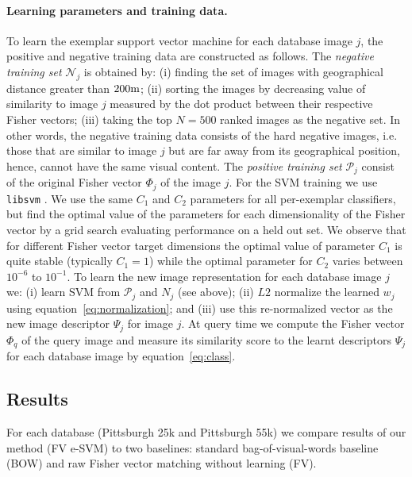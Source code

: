 \documentclass[10pt,twocolumn,letterpaper]{article}
\begin{document}
      \paragraph{Learning parameters and training data.}
         To learn the exemplar support vector machine for each database image $j$, the positive and negative training data are constructed as follows. The \emph{negative training set} $\mathcal N_j$ is obtained by: (i) finding the set of images with geographical distance greater than $200{\rm m}$; (ii)  sorting the images by decreasing value of similarity to image $j$ measured by the dot product between their respective Fisher vectors; (iii) taking the top $N=500$ ranked images as the negative set. In other words, the negative training data consists of the hard negative images, i.e. those that are similar to image $j$ but are far away from its geographical position, hence, cannot have the same visual content. The \emph{positive training set} $\mathcal P_j$
         consist of the original Fisher vector $\Phi_j$ of the image $j$.
         For the SVM training we use {\tt libsvm} \cite{libsvm}.
         We use the same $C_1$ and $C_2$ parameters for all per-exemplar classifiers, but find the optimal value of the parameters for each dimensionality of the Fisher vector by a grid search evaluating performance on a held out set.
         We observe that for different Fisher vector target dimensions the optimal value of parameter $C_1$ is quite stable (typically $C_1=1$) while the optimal parameter for $C_2$ varies between $10^{-6}$ to $10^{-1}$.
         To learn the new image representation for each database image $j$ we: (i) learn SVM from $\mathcal P_j$ and $N_j$ (see above); (ii) $L2$ normalize the learned $w_j$ using equation~\eqref{eq:normalization}; and (iii) use this re-normalized vector as the new image descriptor $\Psi_j$ for image $j$. At query time we compute the Fisher vector $\Phi_q$ of the query image and measure its similarity score to the learnt descriptors $\Psi_j$ for each database image by equation~\eqref{eq:class}.
   

   \subsection{Results}  
      For each database (Pittsburgh 25k and Pittsburgh 55k) we compare results of our method (FV e-SVM) to two baselines: standard bag-of-visual-words baseline (BOW) and raw Fisher vector matching without learning (FV). 
\end{document}
